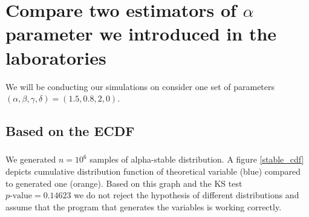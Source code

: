 \documentclass{article}
\begin{document}
		\section{Compare two estimators of $\alpha$ parameter we introduced in the laboratories}

		We will be conducting our simulations on consider one set of parameters $(\alpha, \beta , \gamma, \delta) = (1.5, 0.8, 2, 0)$.

		\subsection{Based on the ECDF}
		\subsubsection{}
		We generated $n = 10^6$ samples of alpha-stable distribution.
		A figure \ref{stable_cdf} depicts cumulative distribution function of theoretical variable (blue) compared to generated one (orange).
		Based on this graph  and the KS test $p\text{-value} = 0.14623$ we do not reject the hypothesis of different distributions and assume that the program that generates the variables is working correctly.
		
\end{document}
